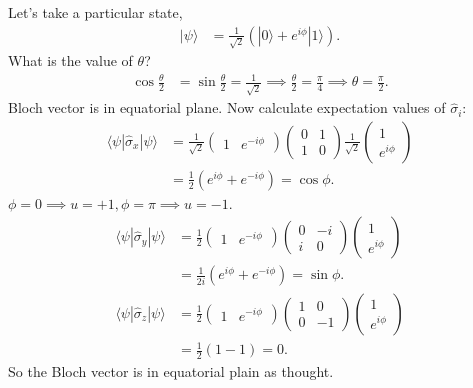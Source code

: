 \documentclass[a4paper, 11pt, normalem]{report}
\begin{document}
\begin{example}
    Let's take a particular state,
    \begin{align}
        |\psi\rangle &= \frac{1}{\sqrt{2}}\left(|0\rangle+e^{i\phi}|1\rangle\right).
    \end{align}
    What is the value of $\theta$?
    \begin{align}
        \cos\frac{\theta}{2} &= \sin\frac{\theta}{2} = \frac{1}{\sqrt{2}} \implies \frac{\theta}{2} = \frac{\pi}{4} \implies \theta = \frac{\pi}{2}.
    \end{align}
    Bloch vector is in equatorial plane.
    Now calculate expectation values of $\hat{\sigma}_i$:
    \begin{align}
        \langle\psi|\hat{\sigma}_x|\psi\rangle &= \frac{1}{\sqrt{2}}\begin{pmatrix} 1 & e^{-i\phi}\end{pmatrix}\begin{pmatrix}0 & 1 \\ 1 & 0 \end{pmatrix}\frac{1}{\sqrt{2}}\begin{pmatrix}1 \\ e^{i\phi}\end{pmatrix} \\
                                               &= \frac12\left(e^{i\phi}+e^{-i\phi}\right) = \cos\phi.
    \end{align}
    $\phi=0\implies u=+1, \phi=\pi \implies u=-1$.
    \begin{align}
        \langle\psi|\hat{\sigma}_y|\psi\rangle &= \frac12\begin{pmatrix}1 & e^{-i\phi}\end{pmatrix}\begin{pmatrix}0 & -i \\ i & 0\end{pmatrix}\begin{pmatrix} 1 \\ e^{i\phi}\end{pmatrix} \\
                                               &= \frac{1}{2i}\left(e^{i\phi}+e^{-i\phi}\right) = \sin\phi. \\
        \langle\psi|\hat{\sigma}_z|\psi\rangle &= \frac12\begin{pmatrix} 1 & e^{-i\phi}\end{pmatrix}\begin{pmatrix}1 & 0 \\ 0 & -1\end{pmatrix}\begin{pmatrix}1 \\ e^{i\phi}\end{pmatrix} \\
                                               &= \frac12\left(1-1\right) = 0.
    \end{align}
    So the Bloch vector is in equatorial plain as thought.
\end{example}
\end{document}
